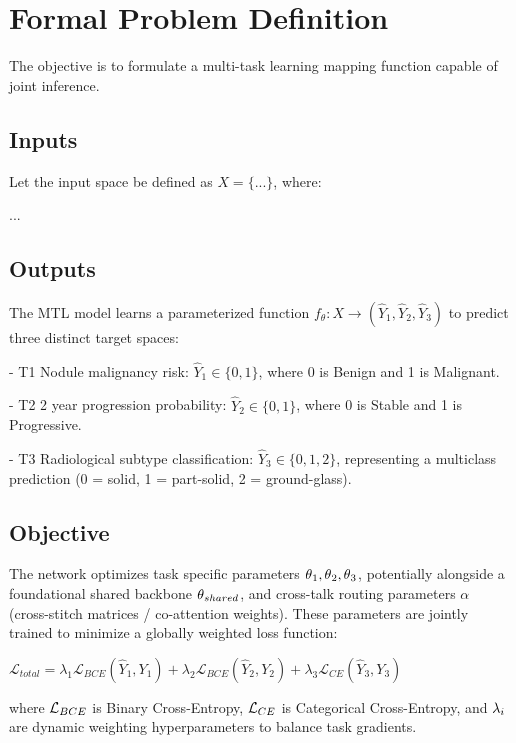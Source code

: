 \section{Formal Problem Definition}
\label{section:formalProblemDefinition}
The objective is to formulate a multi-task learning mapping function capable of joint inference.

\subsection{Inputs}
Let the input space be defined as $X = \{...\}$, where:

...

\subsection{Outputs}
The MTL model learns a parameterized function $f_\theta: X \rightarrow (\hat{Y}_1, \hat{Y}_2, \hat{Y}_3)$
 to predict three distinct target spaces:

- T1 Nodule malignancy risk: $\hat{Y}_1 \in \{0, 1\}$, where 0 is Benign and 1 is Malignant.

- T2 2 year progression probability: $\hat{Y}_2 \in \{0, 1\}$, where 0 is Stable and 1 is Progressive.

- T3 Radiological subtype classification: $\hat{Y}_3 \in \{0, 1, 2\}$, representing a multiclass prediction (0 = solid, 1 = part-solid, 2 = ground-glass).

\subsection{Objective}
The network optimizes task specific parameters ${\theta\\}_{1}, {\theta\\}_{2}, {\theta\\}_{3}$, potentially alongside a foundational shared backbone ${\theta\\}_{shared}$, and cross-talk routing parameters $\alpha$ (cross-stitch matrices / co-attention weights). These parameters are jointly trained to minimize a globally weighted loss function:

$\mathcal{L}_{total} = \lambda_1 \mathcal{L}_{BCE}(\hat{Y}_1, Y_1) + \lambda_2 \mathcal{L}_{BCE}(\hat{Y}_2, Y_2) + \lambda_3 \mathcal{L}_{CE}(\hat{Y}_3, Y_3)$

where ${\mathcal{L}\\}_{BCE}$ is Binary Cross-Entropy, ${\mathcal{L}\\}_{CE}$ is Categorical Cross-Entropy, and ${\lambda\\}_i$ are dynamic weighting hyperparameters to balance task gradients.

